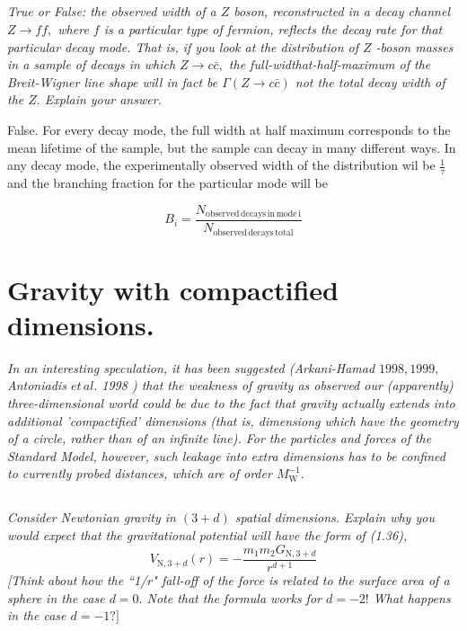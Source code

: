 \documentclass{article}
\begin{document}
\subsection{}
\textit{True or False: the observed width of a $Z$ boson, reconstructed in a decay channel $Z \rightarrow f f,$ where $f$ is a particular type of fermion, reflects the decay rate for that particular decay mode. That is, if you look at the distribution of $Z$ -boson masses in a sample of decays in which $Z \rightarrow c \bar{c},$ the full-widthat-half-maximum of the Breit-Wigner line shape will in fact be $\Gamma(Z \rightarrow c \bar{c})$ not the total decay width of the $Z .$ Explain your answer.}

False. For every decay mode, the full width at half maximum corresponds to the mean lifetime of the sample, but the sample can decay in many different ways. In any decay mode, the experimentally observed width of the distribution wil be $\frac{1}{\tau}$ and the branching fraction for the particular mode will be 

$$ B_i = \frac{N_\mathrm{observed\, decays\, in\, mode\, i}}{N_\mathrm{observed\, decays\, total}}$$

\newpage

\section{Gravity with compactified dimensions.}
\textit{In an interesting speculation, it has been suggested (Arkani-Hamad $1998,1999,$ Antoniadis $e t\, al.$ 1998 ) that the weakness of gravity as observed our (apparently) three-dimensional world could be due to the fact that gravity actually extends into additional 'compactified' dimensions (that is, dimensiong which have the geometry of a circle, rather than of an infinite line). For the particles and forces of the Standard Model, however, such leakage into extra dimensions has to be confined to currently probed distances, which are of order $M_{\mathrm{W}}^{-1}.$}

\subsection{}
\textit{Consider Newtonian gravity in $(3+d)$ spatial dimensions. Explain why you would expect that the gravitational potential will have the form of (1.36), 
$$
V_{\mathrm{N}, 3+d}(r)=-\frac{m_{1} m_{2} G_{\mathrm{N}, 3+d}}{r^{d+1}}
$$
[Think about how the ``1/r" fall-off of the force is related to the surface area of a sphere in the case $d=0 .$ Note that the formula works for $d=-2 !$ What happens in the case $d=-1 ?]$}
\end{document}
